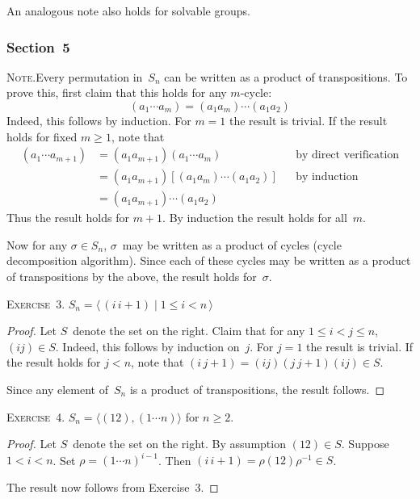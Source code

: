 \documentclass[letterpaper]{article}
\newcommand{\exercise}[1]{\goodbreak\noindent\textsc{Exercise~{#1}.}}
\newcommand{\note}{\goodbreak\noindent\textsc{Note.}}
\newcommand{\gen}[1]{\langle{#1}\rangle}
\begin{document}
An analogous note also holds for solvable groups.

\subsubsection*{Section~5}
\note Every permutation in~$S_n$ can be written as a product of transpositions. To prove this, first claim that this holds for any $m$-cycle:
$$(a_1\cdots a_m)=(a_1a_m)\cdots(a_1a_2)$$
Indeed, this follows by induction. For $m=1$ the result is trivial. If the result holds for fixed $m\ge1$, note that
\begin{align*}
(a_1\cdots a_{m+1})&=(a_1 a_{m+1})(a_1\cdots a_m)&&\text{by direct verification}\\
						&=(a_1 a_{m+1})[(a_1a_m)\cdots (a_1a_2)]&&\text{by induction}\\
						&=(a_1 a_{m+1})\cdots (a_1a_2)
\end{align*}
Thus the result holds for $m+1$. By induction the result holds for all~$m$.

Now for any $\sigma\in S_n$, $\sigma$~may be written as a product of cycles (cycle decomposition algorithm). Since each of these cycles may be written as a product of transpositions by the above, the result holds for~$\sigma$.

\bigskip
\exercise{3} $S_n=\gen{\,(i\,i+1)\mid 1\le i<n\,}$
\begin{proof}
Let $S$~denote the set on the right. Claim that for any $1\le i<j\le n$, $(ij)\in S$. Indeed, this follows by induction on~$j$. For $j=1$ the result is trivial. If the result holds for $j<n$, note that $(i\,j+1)=(ij)(j\,j+1)(ij)\in S$.

Since any element of~$S_n$ is a product of transpositions, the result follows.
\end{proof}

\exercise{4} $S_n=\gen{(12),(1\cdots n)}$ for $n\ge 2$.
\begin{proof}
Let $S$~denote the set on the right. By assumption $(12)\in S$. Suppose $1<i<n$. Set $\rho=(1\cdots n)^{i-1}$. Then $(i\,i+1)=\rho(12)\rho^{-1}\in S$.

The result now follows from Exercise~3.
\end{proof}
\end{document}
